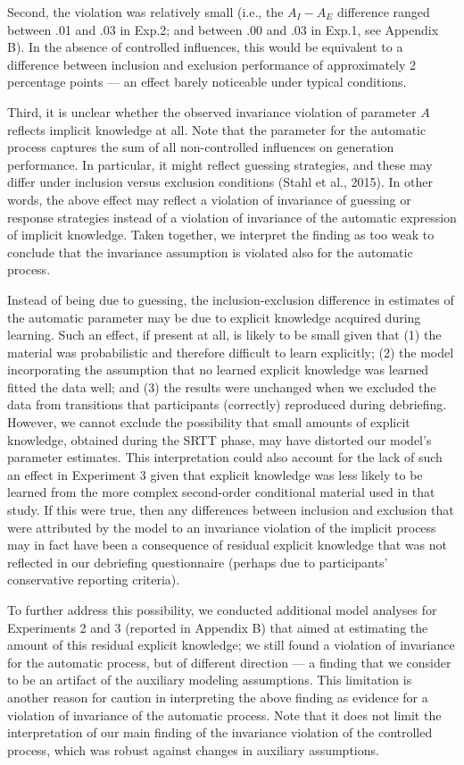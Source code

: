 \documentclass[english,,man]{apa6}
\begin{document}
Second, the violation was relatively small (i.e., the \(A_{I}-A_{E}\) difference ranged between .01 and .03 in Exp.2; and between .00 and .03 in Exp.1, see Appendix B).
In the absence of controlled influences, this would be equivalent to a difference between inclusion and exclusion performance of approximately 2 percentage points --- an effect barely noticeable under typical conditions.

Third, it is unclear whether the observed invariance violation of parameter \(A\) reflects implicit knowledge at all.
Note that the parameter for the automatic process captures the sum of all non-controlled influences on generation performance.
In particular, it might reflect guessing strategies, and these may differ under inclusion versus exclusion conditions (Stahl et al., 2015).
In other words, the above effect may reflect a violation of invariance of guessing or response strategies instead of a violation of invariance of the automatic expression of implicit knowledge.
Taken together, we interpret the finding as too weak to conclude that the invariance assumption is violated also for the automatic process.

Instead of being due to guessing, the inclusion-exclusion difference in estimates of the automatic parameter may be due to explicit knowledge acquired during learning.
Such an effect, if present at all, is likely to be small given that
(1) the material was probabilistic and therefore difficult to learn explicitly;
(2) the model incorporating the assumption that no learned explicit knowledge was learned fitted the data well; and
(3) the results were unchanged when we excluded the data from transitions that participants (correctly) reproduced during debriefing.
However, we cannot exclude the possibility that small amounts of explicit knowledge, obtained during the SRTT phase, may have distorted our model's parameter estimates.
This interpretation could also account for the lack of such an effect in Experiment 3 given that explicit knowledge was less likely to be learned from the more complex second-order conditional material used in that study.
If this were true, then any differences between inclusion and exclusion that were attributed by the model to an invariance violation of the implicit process may in fact have been a consequence of residual explicit knowledge that was not reflected in our debriefing questionnaire (perhaps due to participants' conservative reporting criteria).

To further address this possibility, we conducted additional model analyses for Experiments 2 and 3 (reported in Appendix B) that aimed at estimating the amount of this residual explicit knowledge;
we still found a violation of invariance for the automatic process, but of different direction --- a finding that we consider to be an artifact of the auxiliary modeling assumptions.
This limitation is another reason for caution in interpreting the above finding as evidence for a violation of invariance of the automatic process.
Note that it does not limit the interpretation of our main finding of the invariance violation of the controlled process, which was robust against changes in auxiliary assumptions.
\end{document}
